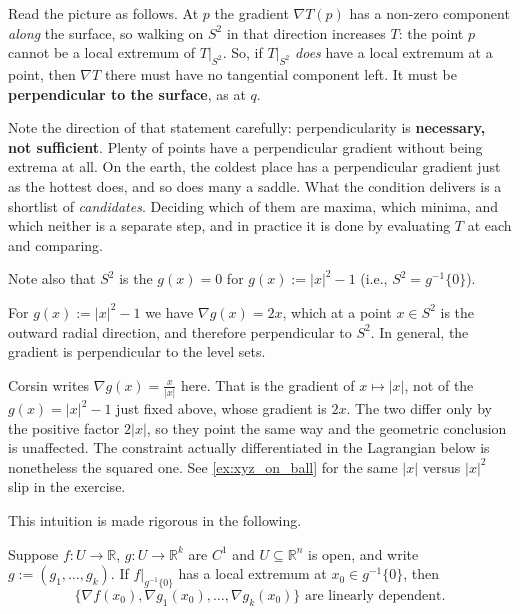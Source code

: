 Read the picture as follows. At $p$ the gradient $\nabla T(p)$ has a non-zero component
\emph{along} the surface, so walking on $S^2$ in that direction increases $T$: the point $p$
cannot be a local extremum of $T|_{S^2}$. So, if $T|_{S^2}$ \emph{does} have a local extremum at a
point, then $\nabla T$ there must have no tangential component left. It must be
\textbf{perpendicular to the surface}, as at $q$.

Note the direction of that statement carefully: perpendicularity is \textbf{necessary, not
sufficient}. Plenty of points have a perpendicular gradient without being extrema at all. On the
earth, the coldest place has a perpendicular gradient just as the hottest does, and so does many
a saddle. What the condition delivers is a shortlist of \emph{candidates}. Deciding which of them
are maxima, which minima, and which neither is a separate step, and in practice it is done by
evaluating $T$ at each and comparing.

Note also that $S^2$ is the   $g(x) = 0$ for
$g(x) := |x|^2 - 1$ (i.e., $S^2 = g^{-1}\{0\}$).

\begin{remark}
For $g(x) := |x|^2-1$ we have $\nabla g(x) = 2x$, which at a point $x \in S^2$ is the outward
radial direction, and therefore perpendicular to $S^2$. In general, the gradient is perpendicular
to the level sets.
\end{remark}

\begin{ainote}
Corsin writes $\nabla g(x) = \tfrac{x}{|x|}$ here. That is the gradient of $x \mapsto |x|$, not
of the $g(x) = |x|^2-1$ just fixed above, whose gradient is $2x$. The two differ only by the
positive factor $2|x|$, so they point the same way and the geometric conclusion is unaffected.
The constraint actually differentiated in the Lagrangian below is nonetheless the squared one.
See \cref{ex:xyz_on_ball} for the same $|x|$ versus $|x|^2$ slip in the exercise.
\end{ainote}

This intuition is made rigorous in the following.

\begin{proposition}
\label{prop:constrained_optimization}
Suppose $f : U \to \mathbb{R}$, $g : U \to \mathbb{R}^k$ are $C^1$ and $U \subseteq \mathbb{R}^n$
is open, and write $g := (g_1,\dots,g_k)$. If $f|_{g^{-1}\{0\}}$ has a local extremum at
$x_0 \in g^{-1}\{0\}$, then
\[\{\nabla f(x_0), \nabla g_1(x_0), \dots, \nabla g_k(x_0)\} \text{ are linearly dependent.}\]
\end{proposition}

